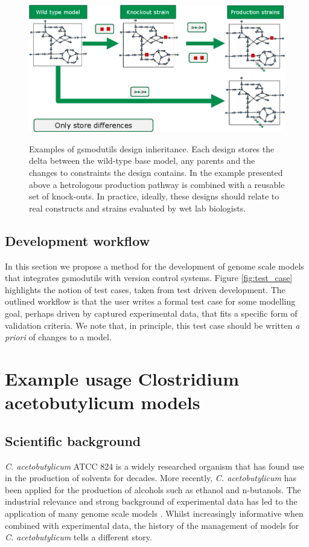 \documentclass[a4paper,10pt]{article}
\begin{document}
\begin{figure}
  \includegraphics[width=\textwidth]{inheritence.png}
  \label{fig:strain_hered}
  \caption{Examples of gsmodutils design inheritance.
  Each design stores the delta between the wild-type base model, any parents and the changes to constraints the design contains.
  In the example presented above a hetrologous production pathway is combined with a reusable set of knock-outs.
  In practice, ideally, these designs should relate to real constructs and strains evaluated by wet lab biologists.
  }
\end{figure}

\subsection{Development workflow}
In this section we propose a method for the development of genome scale models that integrates gsmodutils with version control systems.
Figure \ref{fig:test_case} highlights the notion of test cases, taken from test driven development.
The outlined workflow is that the user writes a formal test case for some modelling goal, perhaps driven by captured experimental data, that fits a specific form of validation criteria.
We note that, in principle, this test case should be written \textit{a priori} of changes to a model.

\section{Example usage Clostridium acetobutylicum models}
\subsection{Scientific background}
\textit{C. acetobutylicum} ATCC 824 is a widely researched organism that has found use in the production of solvents for decades.
More recently, \textit{C. acetobutylicum} has been applied for the production of alcohols such as ethanol and n-butanols.
The industrial relevance and strong background of experimental data has led to the application of many genome scale models \cite{}.
Whilst increasingly informative when combined with experimental data, the history of the management of models for \textit{C. acetobutylicum} tells a different story.
\end{document}
